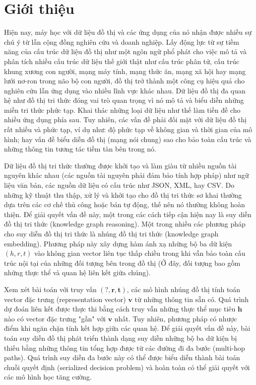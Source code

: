 \section{Giới thiệu}
Hiện nay, máy học với dữ liệu đồ thị và các ứng dụng của nó nhận được nhiều sự chú ý từ lẫn cộng đồng nghiên cứu và doanh nghiệp. Lấy động lực từ sự tiềm năng của cấu trúc dữ liệu đồ thị như một ngôn ngữ phổ phát cho việc mô tả và phân tích nhiều cấu trúc dữ liệu thế giới thật như cấu trúc phân tử, cấu trúc khung xương con người, mạng máy tính, mạng thức ăn, mạng xã hội hay mạng lưới nơ-ron trong não bộ con người, đồ thị trở thành một công cụ hiệu quả cho nghiên cứu lẫn ứng dụng vào nhiều lĩnh vực khác nhau. Dữ liệu đồ thị đa quan hệ như đồ thị tri thức đóng vai trò quan trọng vì nó mô tả và biểu diễn những miền tri thức phức tạp. Khai thác những loại dữ liệu như thế làm tiền đề cho nhiều ứng dụng phía sau. Tuy nhiên, các vấn đề phải đối mặt với dữ liệu đồ thị rất nhiều và phức tạp, ví dụ như: độ phức tạp về không gian và thời gian của mô hình; hay vấn đề biểu diễn đồ thị (mạng nói chung) sao cho bảo toàn cấu trúc và những thông tin tương tác tiềm tàn bên trong nó.

Dữ liệu đồ thị tri thức thường được khởi tạo và làm giàu từ nhiều nguồn tài nguyên khác nhau (các nguồn tài nguyên phải đảm bảo tính hợp pháp) như ngữ liệu văn bản, các nguồn dữ liệu có cấu trúc như JSON, XML, hay CSV. Do những kỹ thuật thu thập, xử lý và khởi tạo cho đồ thị tri thức sơ khai thường dựa trên các cơ chế thủ công hoặc bán tự động, thế nên nó thường không hoàn thiện. Để giải quyết vấn đề này, một trong các cách tiếp cận hiện nay là suy diễn đồ thị tri thức (knowledge graph reasoning). Một trong nhiều các phương pháp cho suy diễn đồ thị tri thức là nhúng đồ thị tri thức (knowledge graph embedding). Phương pháp này xây dựng hàm ánh xạ những bộ ba dữ kiện $(h, r, t)$ vào không gian vector liên tục thấp chiều trong khi vẫn bảo toàn cấu trúc nội tại của những đối tượng bên trong đồ thị (Ở đây, đối tượng bao gồm những thực thể và quan hệ liên kết giữa chúng).

Xem xét bài toán với truy vấn $(?, \mathbf{r}, \mathbf{t})$, các mô hình nhúng đồ thị tính toán vector đặc trưng (representation vector) $\mathbf{v}$ từ những thông tin sẵn có. Quá trình dự đoán liên kết được thực thi bằng cách truy vẫn những thực thể mục tiêu $\mathbf{h}$ nào có vector đặc trưng "gần" với $\mathbf{v}$ nhất. Tuy nhiên, phương pháp có nhược điểm khi ngăn chặn tính kết hợp giữa các quan hệ. Để giải quyết vấn đề này, bài toán suy diễn đồ thị phát triển thành dạng suy diễn những bộ ba dữ kiện bị thiếu bằng những thông tin tổng hợp được từ các đường đi đa bước (multi-hop paths). Quá trình suy diễn đa bước này có thể được biểu diễn thành bài toán chuỗi quyết định (serialized decision problem) và hoàn toàn có thể giải quyết với các mô hình học tăng cường.

